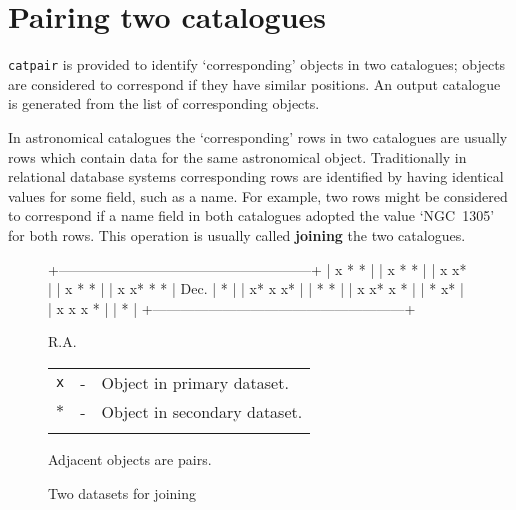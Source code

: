 \documentclass[twoside,11pt]{starlink}
\begin{document}
\section{\label{PAIR}Pairing two catalogues}

\texttt{catpair} is provided to identify `corresponding' objects
in two catalogues; objects are considered to correspond if they have
similar positions. An output catalogue is generated from the list of
corresponding objects.

In astronomical catalogues the `corresponding' rows in two catalogues
are usually rows which contain data for the same astronomical object.
Traditionally in relational database systems corresponding rows are
identified by having identical values for some field, such as a name.
For example, two rows might be considered to correspond if a name field
in both catalogues adopted the value `NGC~1305' for both rows. This
operation is usually called \textbf{joining} the two catalogues.

\begin{figure}[htbp]

\begin{terminalv}
          +------------------------------------------------------+
          |         x                    *                 *     |
          |  x                *                *                 |
          |                         x                x*          |
          |           x                  *                  *    |
          |    x          x*       *             *               |
     Dec. |                                           *          |
          |        x*            x         x*                    |
          |                                      *          *    |
          |   x        x*  x         *                           |
          |                                 *       x*           |
          |      x       x      x                          *     |
          |                             *                        |
          +------------------------------------------------------+

                                    R.A.
\end{terminalv}

\begin{center}
\begin{tabular}{lll}
\texttt{x} &  -  &  Object in primary dataset.    \\
$\ast$  &  -  &  Object in secondary dataset.  \\
   &  &  \\
\end{tabular}

Adjacent objects are pairs.
\end{center}

\caption{Two datasets for joining \label{TWO_CAT} }

\end{figure}
\end{document}

